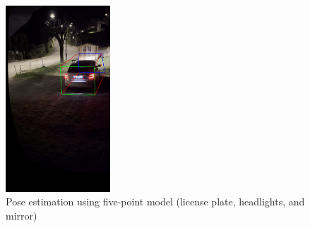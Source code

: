 \begin{figure}[h]
    \centering
    \includegraphics[width=0.35\textwidth]{Images/method4/bbox_5pts_iterative.jpg}
    \caption{Pose estimation using five-point model (license plate, headlights, and mirror)}
    \label{fig:method4_result}
\end{figure}
